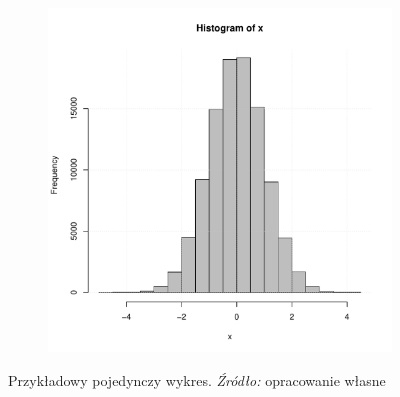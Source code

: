 \documentclass[polish, twoside, 12pt, a4paper]{article}
\theoremstyle{definition}
\theoremstyle{plain}
\theoremstyle{remark}
\begin{document}
\begin{figure}[hbt]
  \centering

  \begin{subfigure}[t]{0.45\textwidth}
    \includegraphics[width=\textwidth]{./figure-1}
  \end{subfigure}

  \captionsetup{margin=10pt,font=small,labelfont=bf,width=.8\textwidth}

  \caption[Krótka nazwa X]{Przykładowy pojedynczy wykres. \textit{Źródło:} opracowanie własne}\label{fig:xxx1}
\end{figure}
\end{document}
